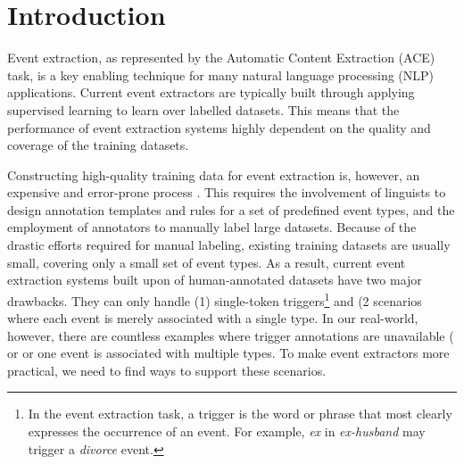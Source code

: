 \section{Introduction}
%

Event extraction, as represented by the Automatic Content Extraction (ACE) task, is a key enabling technique for many natural language
processing (NLP) applications.  Current event extractors are typically built through applying supervised learning to learn over labelled
datasets. This means that the performance of event extraction systems highly dependent on the quality and coverage of the training
datasets.

Constructing high-quality training data for event extraction is, however, an expensive and error-prone process
\cite{aguilar2014comparison,song2015light}. This requires the involvement of linguists to design annotation templates and rules for a set
of predefined event types, and the employment of annotators to manually label  large datasets. Because of the drastic efforts required for
manual labeling, existing training datasets are usually small, covering only a small set of event types. As a result, current event
extraction systems built upon of human-annotated datasets have two major drawbacks. They can only handle (1) single-token
triggers\footnote{In the event extraction task, a trigger is the word or phrase that most clearly expresses the occurrence of an event. For
example, \textit{ex} in \textit{ex-husband} may trigger a \emph{divorce} event.} and (2 scenarios where  each event is merely associated
with a single type. In our real-world, however, there are countless examples where trigger annotations are unavailable ( or or one event is associated with multiple types. To make event extractors more practical, we
need to find ways to support these scenarios.

